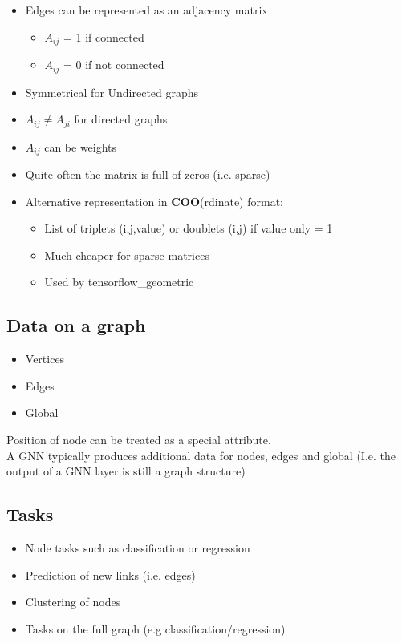 \quad
\begin{itemize}
	
	\item Edges can be represented as an adjacency matrix
	\begin{itemize}
		\item $A_{ij}$ = 1 if connected
		\item $A_{ij}$ = 0 if not connected
	\end{itemize}
	\item Symmetrical for Undirected graphs
	\item $A_{ij} \neq A_{ji}$ for directed graphs
	\item $A_{ij}$ can be weights
	\item Quite often the matrix is full of zeros (i.e. sparse)
	\item Alternative representation in \textbf{COO}(rdinate) format:
	\begin{itemize}
		\item List of triplets (i,j,value) or doublets (i,j) if value only = 1
		\item Much cheaper for sparse matrices
		\item Used by tensorflow\_geometric
	\end{itemize}
\end{itemize}


\subsection{Data on a graph}
\begin{itemize}
	\item Vertices
	\item Edges
	\item Global
\end{itemize}

Position of node can be treated as a special attribute.\\

A GNN typically produces additional data for nodes, edges and global (I.e. the output of a GNN layer is still a graph
structure)

\subsection{Tasks}

\begin{itemize}
	\item Node tasks such as
	classification or regression
	\item Prediction of new links (i.e.
	edges)
	\item Clustering of nodes 
	\item Tasks on the full graph (e.g classification/regression)
\end{itemize}

